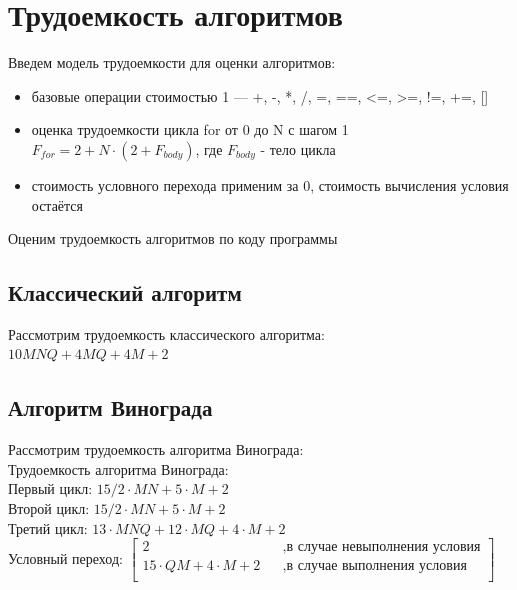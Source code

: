 \documentclass[12pt]{report}
\begin{document}
\section{Трудоемкость алгоритмов}
Введем модель трудоемкости для оценки алгоритмов: 
\begin{itemize}
	\item базовые операции стоимостью 1 — +, -, *, /, =, ==, <=, >=, !=, +=, []
	\item оценка трудоемкости цикла for от 0 до N с шагом 1 $F_{for} = 2 + N \cdot (2 + F_{body})$, где $F_{body}$ - тело цикла
	\item стоимость условного перехода применим за 0, стоимость вычисления условия остаётся
\end{itemize}

Оценим трудоемкость алгоритмов по коду программы

\subsection{Классический алгоритм}
Рассмотрим трудоемкость классического алгоритма:\\

$10MNQ + 4MQ + 4 M + 2$ \\


\subsection{Алгоритм Винограда}

Рассмотрим трудоемкость алгоритма Винограда:\\

Трудоемкость алгоритма Винограда:\\

Первый цикл: $15/2 \cdot M  N + 5 \cdot M + 2$ \\

Второй цикл: $15/2 \cdot M  N + 5 \cdot M + 2$\\

Третий цикл: $13 \cdot M  N Q + 12 \cdot M Q + 4 \cdot M + 2$\\

Условный переход: $\begin{bmatrix}
             2    &&, \text{в случае невыполнения условия}\\
             15 \cdot QM + 4 \cdot M + 2 &&, \text{в случае выполнения условия}\\
           \end{bmatrix} $ \\
\end{document}
